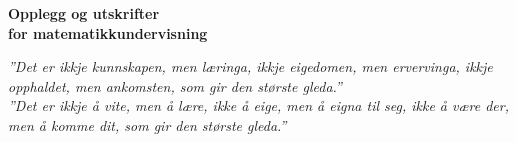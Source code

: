 


	\pagecolor{Aquamarine!30}
	\begin{titlepage}
		\begin{center}
			\vspace*{1cm}
			
			{\Huge \bfseries Opplegg og utskrifter \\[12pt] for matematikkundervisning}
			
			\vspace{2.45cm} 
	        \vspace{20pt}
			\vfill
		 
		 \end{center}
	\end{titlepage}
	\pagecolor{white}
	\newpage
	\thispagestyle{empty} \phantom{}
	

\textit{        ''Det er ikkje kunnskapen, men læringa, ikkje eigedomen, men ervervinga, ikkje opphaldet, men ankomsten, som gir den største gleda.''} \\

\textit{        ''Det er ikkje å vite, men å lære, ikke å eige, men å eigna til seg, ikke å være der, men å komme dit, som gir den største gleda.''}

